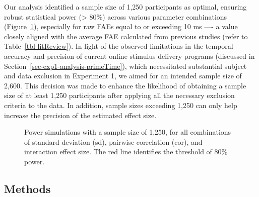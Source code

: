 \documentclass[
]{interact}
\begin{document}
Our analysis identified a sample size of 1,250 participants as optimal,
ensuring robust statistical power (\textgreater{} 80\%) across various
parameter combinations (Figure~\ref{fig-power-1250}), especially for raw
FAEs equal to or exceeding 10 ms ---- a value closely aligned with the
average FAE calculated from previous studies (refer to
Table~\ref{tbl-litReview}). In light of the observed limitations in the
temporal accuracy and precision of current online stimulus delivery
programs (discussed in Section~\ref{sec-exp1-analysis-primeTime}), which
necessitated substantial subject and data exclusion in Experiment 1, we
aimed for an intended sample size of 2,600. This decision was made to
enhance the likelihood of obtaining a sample size of at least 1,250
participants after applying all the necessary exclusion criteria to the
data. In addition, sample sizes exceeding 1,250 can only help increase
the precision of the estimated effect size.

\label{cell-fig-power-1250}
\begin{figure}[H]


\caption{\label{fig-power-1250}Power simulations with a sample size of
1,250, for all combinations of standard deviation (sd), pairwise
correlation (cor), and interaction effect size. The red line identifies
the threshold of 80\% power.}

\end{figure}%

\subsection{Methods}\label{sec-exp2-methods}
\end{document}
